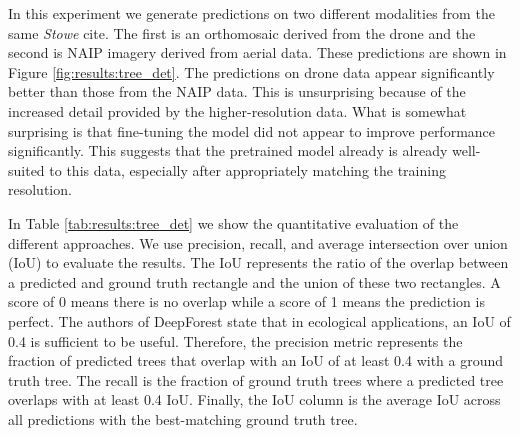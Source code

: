In this experiment we generate predictions on two different modalities from the same \textit{Stowe} cite. The first is an orthomosaic derived from the drone and the second is NAIP imagery derived from aerial data. These predictions are shown in Figure \ref{fig:results:tree_det}. The predictions on drone data appear significantly better than those from the NAIP data. This is unsurprising because of the increased detail provided by the higher-resolution data. What is somewhat surprising is that fine-tuning the model did not appear to improve performance significantly. This suggests that the pretrained model already is already well-suited to this data, especially after appropriately matching the training resolution.

In Table \ref{tab:results:tree_det} we show the quantitative evaluation of the different approaches. We use precision, recall, and average intersection over union (IoU) to evaluate the results. The IoU represents the ratio of the overlap between a predicted and ground truth rectangle and the union of these two rectangles. A score of 0 means there is no overlap while a score of 1 means the prediction is perfect. The authors of DeepForest state that in ecological applications, an IoU of 0.4 is sufficient to be useful. Therefore, the precision metric represents the fraction of predicted trees that overlap with an IoU of at least 0.4 with a ground truth tree. The recall is the fraction of ground truth trees where a predicted tree overlaps with at least 0.4 IoU. Finally, the IoU column is the average IoU across all predictions with the best-matching ground truth tree.

